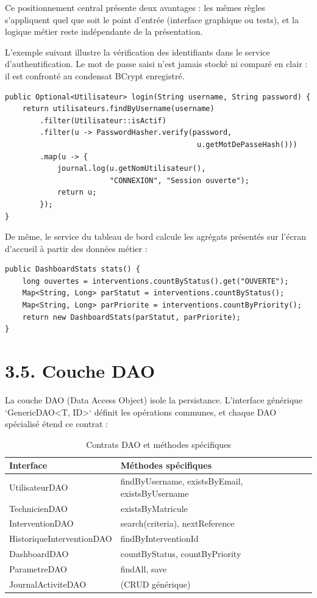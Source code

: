 \documentclass[11pt,a4paper]{report}
\begin{document}
Ce positionnement central présente deux avantages : les mêmes règles s'appliquent quel que soit le point d'entrée (interface graphique ou tests), et la logique métier reste indépendante de la présentation.

L'exemple suivant illustre la vérification des identifiants dans le service d'authentification. Le mot de passe saisi n'est jamais stocké ni comparé en clair : il est confronté au condensat BCrypt enregistré.
\begin{lstlisting}
public Optional<Utilisateur> login(String username, String password) {
    return utilisateurs.findByUsername(username)
        .filter(Utilisateur::isActif)
        .filter(u -> PasswordHasher.verify(password,
                                            u.getMotDePasseHash()))
        .map(u -> {
            journal.log(u.getNomUtilisateur(),
                        "CONNEXION", "Session ouverte");
            return u;
        });
}
\end{lstlisting}

De même, le service du tableau de bord calcule les agrégats présentés sur l'écran d'accueil à partir des données métier :
\begin{lstlisting}
public DashboardStats stats() {
    long ouvertes = interventions.countByStatus().get("OUVERTE");
    Map<String, Long> parStatut = interventions.countByStatus();
    Map<String, Long> parPriorite = interventions.countByPriority();
    return new DashboardStats(parStatut, parPriorite);
}
\end{lstlisting}
\section*{3.5. Couche DAO}

La couche DAO (Data Access Object) isole la persistance. L'interface générique `GenericDAO<T, ID>` définit les opérations communes, et chaque DAO spécialisé étend ce contrat :
\begin{table}[htbp]\centering\small
\begin{tabularx}{\textwidth}{|p{3.8cm}|X|}
\hline\rowcolor{hdr}\textbf{Interface} & \textbf{Méthodes spécifiques}\\ \hline
UtilisateurDAO & findByUsername, existsByEmail, existsByUsername\\ \hline
TechnicienDAO & existsByMatricule\\ \hline
InterventionDAO & search(criteria), nextReference\\ \hline
HistoriqueInterventionDAO & findByInterventionId\\ \hline
DashboardDAO & countByStatus, countByPriority\\ \hline
ParametreDAO & findAll, save\\ \hline
JournalActiviteDAO & (CRUD générique)\\ \hline
\end{tabularx}
\caption{Contrats DAO et méthodes spécifiques}
\end{table}
\end{document}
